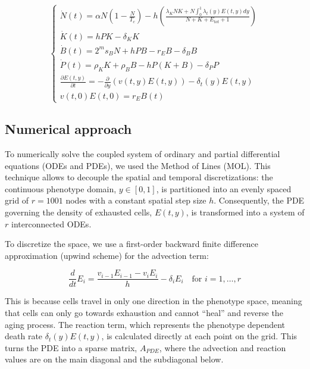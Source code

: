 \documentclass[12pt,a4paper]{article}
\begin{document}
\begin{equation}
\begin{cases}
    \dot{N}(t) = \alpha N \left(1 - \frac{N}{T_c}\right) - h \left( \frac{\lambda_K N K + N\int_0^1\lambda_t(y)E(t,y)dy}{N + K + E_{tot} + 1} \right) \\[2ex]
    \dot{K}(t) = h P K - \delta_K K \\[2ex]
    \dot{B}(t) = 2^m s_B N + h P B - r_E B - \delta_B B \\[2ex]
    \dot{P}(t) = \rho_K K + \rho_B B - h P (K + B) - \delta_P P\\[2ex]
    \frac{\partial E(t,y) }{\partial t}= -\frac{\partial}{\partial y}(v(t,y)E(t,y))-\delta_t(y) E(t,y) \\[2ex]
    v(t,0)E(t,0)=r_E B(t)
\end{cases}
\end{equation}

\subsection{Numerical approach}

To numerically solve the coupled system of ordinary and partial differential equations (ODEs and PDEs), we used the Method of Lines (MOL). This technique allows to decouple the spatial and temporal discretizations: the continuous phenotype domain, $y \in [0, 1]$, is partitioned into an evenly spaced grid of $r = 1001$ nodes with a constant spatial step size $h$. Consequently, the PDE governing the density of exhausted cells, $E(t,y)$, is transformed into a system of $r$ interconnected ODEs.

To discretize the space, we use a first-order backward finite difference approximation (upwind scheme) for the advection term:

\begin{equation}
    \frac{d}{dt}E_i = \frac{v_{i-1}E_{i-1} - v_iE_i}{h} - \delta_i E_i \quad \text{for } i = 1, \dots, r
\end{equation}

This is because cells travel in only one direction in the phenotype space, meaning that cells can only go towards exhaustion and cannot ``heal'' and reverse the aging process. The reaction term, which represents the phenotype dependent death rate $\delta_t(y)E(t,y)$, is calculated directly at each point on the grid. This turns the PDE into a sparse matrix, $A_{PDE}$, where the advection and reaction values are on the main diagonal and the subdiagonal below. 
\end{document}
